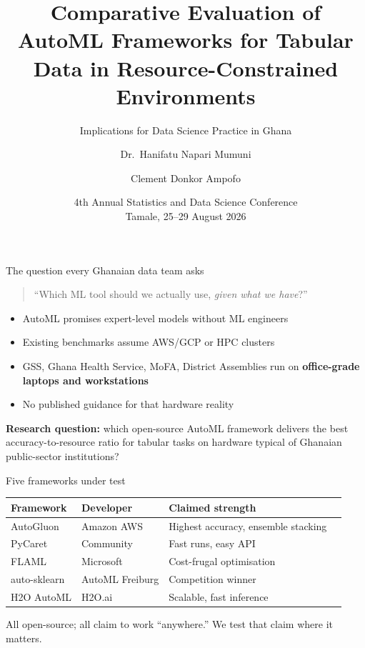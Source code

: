 \documentclass[aspectratio=169,10pt]{beamer}
\title[AutoML under Resource Constraints]{Comparative Evaluation of AutoML Frameworks for Tabular Data in Resource-Constrained Environments}
\subtitle{Implications for Data Science Practice in Ghana}
\author[Mumuni \& Ampofo]{Dr.~Hanifatu Napari Mumuni\inst{1} \and Clement Donkor Ampofo\inst{2}}
\institute[TaTU]{\inst{1}Tamale Technical University \and \inst{2}MTech, Data Science}
\date[GSA 2026]{4th Annual Statistics and Data Science Conference \\ Tamale, 25--29 August 2026}
\begin{document}
\begin{frame}
  \titlepage
\end{frame}

\begin{frame}{The question every Ghanaian data team asks}
  \begin{quote}
    \large ``Which ML tool should we actually use, \emph{given what we have}?''
  \end{quote}
  \vfill
  \begin{itemize}
    \item AutoML promises expert-level models without ML engineers
    \item Existing benchmarks assume AWS/GCP or HPC clusters
    \item GSS, Ghana Health Service, MoFA, District Assemblies run on
          \textbf{office-grade laptops and workstations}
    \item No published guidance for that hardware reality
  \end{itemize}
  \vfill
  \textbf{Research question:} which open-source AutoML framework delivers the
  best accuracy-to-resource ratio for tabular tasks on hardware typical of
  Ghanaian public-sector institutions?
\end{frame}

\begin{frame}{Five frameworks under test}
  \centering
  \begin{tabular}{@{}llll@{}}
    \toprule
    Framework & Developer & Claimed strength \\
    \midrule
    AutoGluon    & Amazon AWS       & Highest accuracy, ensemble stacking \\
    PyCaret      & Community        & Fast runs, easy API \\
    FLAML        & Microsoft        & Cost-frugal optimisation \\
    auto-sklearn & AutoML Freiburg  & Competition winner \\
    H2O AutoML   & H2O.ai           & Scalable, fast inference \\
    \bottomrule
  \end{tabular}
  \vfill
  All open-source; all claim to work ``anywhere.''
  We test that claim where it matters.
\end{frame}
\end{document}
